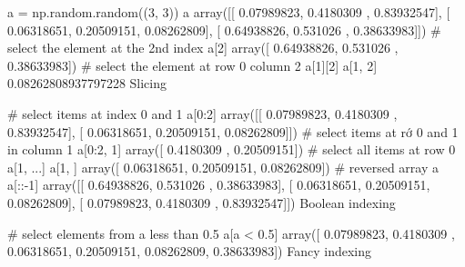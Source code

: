 a = np.random.random((3, 3))
a
array([[ 0.07989823, 0.4180309 , 0.83932547], [ 0.06318651, 0.20509151, 0.08262809], [ 0.64938826, 0.531026 , 0.38633983]])
# select the element at the 2nd index
a[2]
array([ 0.64938826, 0.531026 , 0.38633983])
# select the element at row 0 column 2
a[1][2]
a[1, 2]
0.08262808937797228
Slicing

# select items at index 0 and 1
a[0:2]
array([[ 0.07989823, 0.4180309 , 0.83932547], [ 0.06318651, 0.20509151, 0.08262809]])
# select items at rớ 0 and 1 in column 1
a[0:2, 1]
array([ 0.4180309 , 0.20509151])
# select all items at row 0
a[1, ...]
a[1, ]
array([ 0.06318651, 0.20509151, 0.08262809])
# reversed array a
a[::-1]
array([[ 0.64938826, 0.531026 , 0.38633983], [ 0.06318651, 0.20509151, 0.08262809], [ 0.07989823, 0.4180309 , 0.83932547]])
Boolean indexing

# select elements from a less than 0.5
a[a < 0.5]
array([ 0.07989823, 0.4180309 , 0.06318651, 0.20509151, 0.08262809, 0.38633983])
Fancy indexing

